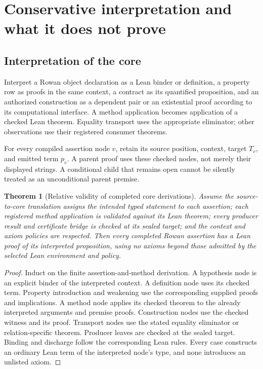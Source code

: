 \documentclass[11pt,letterpaper]{article}
\newtheorem{theorem}{Theorem}[section]
\theoremstyle{definition}\newtheorem{definition}[theorem]{Definition}
\theoremstyle{remark}\newtheorem{remark}[theorem]{Remark}
\begin{document}
\section{Conservative interpretation and what it does not prove}
\label{sec:soundness}

\subsection{Interpretation of the core}
Interpret a Rowan object declaration as a Lean binder or definition, a
property row as proofs in the same context, a contract as its quantified
proposition, and an authorized construction as a dependent pair or an
existential proof according to its computational interface. A method
application becomes application of a checked Lean theorem. Equality transport
uses the appropriate eliminator; other observations use their registered
consumer theorems.

For every compiled assertion node $v$, retain its source position, context,
target $T_v$, and emitted term $p_v$. A parent proof uses these checked nodes,
not merely their displayed strings. A conditional child that remains open
cannot be silently treated as an unconditional parent premise.

\begin{theorem}[Relative validity of completed core derivations]
Assume the source-to-core translation assigns the intended typed statement to
each assertion; each registered method application is validated against its
Lean theorem; every producer result and certificate bridge is checked at its
sealed target; and the context and axiom policies are respected. Then every
completed Rowan assertion has a Lean proof of its interpreted proposition,
using no axioms beyond those admitted by the selected Lean environment and
policy.
\end{theorem}
\begin{proof}
Induct on the finite assertion-and-method derivation. A hypothesis node is an
explicit binder of the interpreted context. A definition node uses its checked
term. Property introduction and weakening use the corresponding supplied
proofs and implications. A method node applies its checked theorem to the
already interpreted arguments and premise proofs. Construction nodes use the
checked witness and its proof. Transport nodes use the stated equality
eliminator or relation-specific theorem. Producer leaves are checked at the
sealed target. Binding and discharge follow the corresponding Lean rules.
Every case constructs an ordinary Lean term of the interpreted node's type,
and none introduces an unlisted axiom.
\end{proof}
\end{document}
